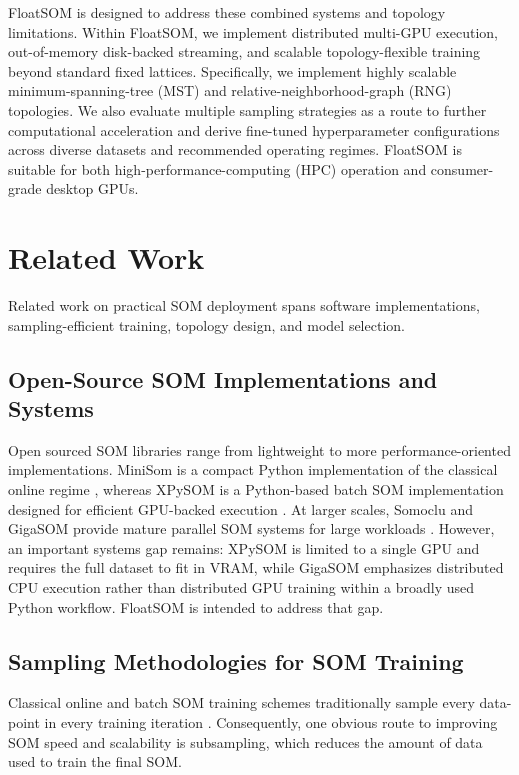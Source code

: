 \documentclass[10pt]{article} %
\begin{document}
FloatSOM is designed to address these combined systems and topology limitations. Within FloatSOM, we implement distributed multi-GPU execution, out-of-memory disk-backed streaming, and scalable topology-flexible training beyond standard fixed lattices. Specifically, we implement highly scalable minimum-spanning-tree (MST) and relative-neighborhood-graph (RNG) topologies. We also evaluate multiple sampling strategies as a route to further computational acceleration and derive fine-tuned hyperparameter configurations across diverse datasets and recommended operating regimes. FloatSOM is suitable for both high-performance-computing (HPC) operation and consumer-grade desktop GPUs.

\section{Related Work}

Related work on practical SOM deployment spans software implementations, sampling-efficient training, topology design, and model selection.

\subsection{Open-Source SOM Implementations and Systems}

Open sourced SOM libraries range from lightweight to more performance-oriented implementations. MiniSom is a compact Python implementation of the classical online regime \citep{vettigliJustGlowingMinisom2018}, whereas XPySOM is a Python-based batch SOM implementation designed for efficient GPU-backed execution \citep{manciniXPySomHighPerformanceSelfOrganizing2020}. At larger scales, Somoclu and GigaSOM provide mature parallel SOM systems for large workloads \citep{wittekSomocluEfficientParallel2017,kratochvilGigaSOMjlHighperformanceClustering2020}. However, an important systems gap remains: XPySOM is limited to a single GPU and requires the full dataset to fit in VRAM, while GigaSOM emphasizes distributed CPU execution rather than distributed GPU training within a broadly used Python workflow. FloatSOM is intended to address that gap.

\subsection{Sampling Methodologies for SOM Training}

Classical online and batch SOM training schemes traditionally sample every data-point in every training iteration \citep{kohonenSelfOrganizingMaps2001,liuRobustPhenotypingHighly2023}. Consequently, one obvious route to improving SOM speed and scalability is subsampling, which reduces the amount of data used to train the final SOM.
\end{document}

